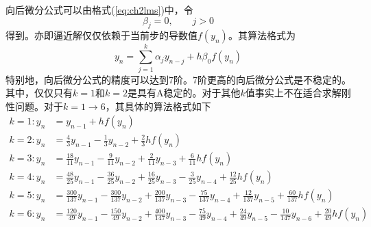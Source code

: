 向后微分公式可以由格式(\ref{eq:ch2lms})中，令
\begin{equation}
\beta_j=0,\qquad j>0
\end{equation}
得到。亦即逼近解仅仅依赖于当前步的导数值$f(y_n)$。其算法格式为
\begin{equation}
y_n=\sum_{j=1}^{k}\alpha_jy_{n-j}+h\beta_0f(y_n)\label{eq:ch2BDF}
\end{equation}
特别地，向后微分公式的精度可以达到7阶。7阶更高的向后微分公式是不稳定的\cite{Gear1971a}。其中，仅仅只有$k=1$和$k=2$是具有A稳定的。对于其他$k$值事实上不在适合求解刚性问题。对于$k=1\to 6$，其具体的算法格式如下
\begin{align}
k=1:y_n&=y_{n-1}+hf(y_n)\\
k=2:y_n&=\frac{4}{3}y_{n-1}-\frac13y_{n-2}+\frac23hf(y_n)\\
k=3:y_n&=\frac{18}{11}y_{n-1}-\frac{9}{11}y_{n-2}+\frac{2}{11}y_{n-3}+\frac{6}{11}hf(y_{n})\\
k=4:y_n&=\frac{48}{25}y_{n-1}-\frac{36}{25}y_{n-2}+\frac{16}{25}y_{n-3}-\frac{3}{25}y_{n-4}+\frac{12}{25}hf(y_n)\\
k=5:y_n&=\frac{300}{137}y_{n-1}-\frac{300}{137}y_{n-2}+\frac{200}{137}y_{n-3}-\frac{75}{137}y_{n-4}+\frac{12}{137}y_{n-5}+\frac{60}{137}hf(y_n)\\
k=6:y_n&=\frac{120}{49}y_{n-1}-\frac{150}{49}y_{n-2}+\frac{400}{147}y_{n-3}-\frac{75}{49}y_{n-4}+\frac{24}{49}y_{n-5}-\frac{10}{147}y_{n-6}+\frac{20}{49}hf(y_n)
\end{align}

